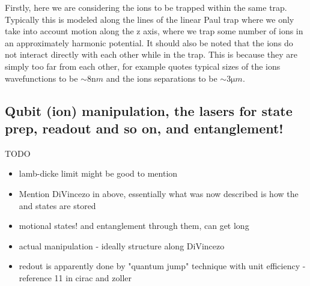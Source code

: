Firstly, here we are considering the ions to be trapped within the same trap.
Typically this is modeled along the lines of the linear Paul trap where we only take into account motion along the z axis, where we trap some number of ions in an approximately harmonic potential\footnotemark.
It should also be noted that the ions do not interact directly with each other while in the trap.
This is because they are simply too far from each other, for example \cite{schaferFastGatesMixedSpecies2020} quotes typical sizes of the ions wavefunctions to be $\sim 8 \si{\nano m}$ and the ions separations to be $\sim 3 \si{\micro m}$.






\subsection{Qubit (ion) manipulation, the lasers for state prep, readout and so on, and entanglement!}

TODO
\begin{itemize}
    \item lamb-dicke limit might be good to mention
    \item Mention DiVincezo in above, essentially what was now described is how the \kz and \ko states are stored
    \item motional states! and entanglement through them, can get long
    \item actual manipulation - ideally structure along DiVincezo
    \item redout is apparently done by "quantum jump" technique with unit efficiency - reference 11 in cirac and zoller
\end{itemize}

